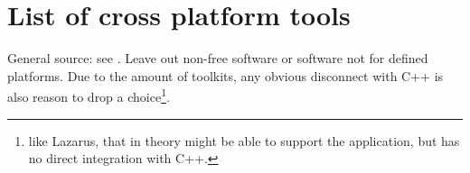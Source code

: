 \begin{center}
\begin{tabular}{lccccp{10em}}
	\hline
    \end{tabular}
\end{center}



\section{List of cross platform tools}

General source: see \cite{wiki:xplatf}. Leave out non-free software or software
not for defined platforms. Due to the amount of toolkits, any obvious disconnect with C++
is also reason to drop a choice\footnote{like Lazarus, that in theory might be able to
support the application, but has no direct integration with C++.}.

